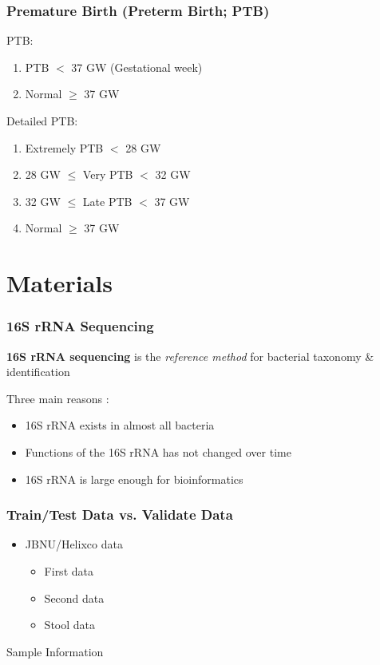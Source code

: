 \documentclass{beamer}
\begin{document}
    \begin{frame}
        \frametitle{Premature Birth (Preterm Birth; PTB)}

        PTB:
        \begin{enumerate}
            \item PTB $<$ 37 GW (Gestational week)
            \item Normal $\ge$ 37 GW
        \end{enumerate}

        Detailed PTB:
        \begin{enumerate}
            \item Extremely PTB $<$ 28 GW
            \item 28 GW $\le$ Very PTB $<$ 32 GW
            \item 32 GW $\le$ Late PTB $<$ 37 GW
            \item Normal $\ge$ 37 GW
        \end{enumerate}

        \cite{premature1, premature2}
    \end{frame}

    \section{Materials}
    \begin{frame}
        \frametitle{16S rRNA Sequencing}

        \textbf{16S rRNA sequencing} is the \textit{reference method} for bacterial taxonomy \& identification \cite{16S1}

        Three main reasons \cite{16S2}:
        \begin{itemize}
            \item 16S rRNA exists in almost all bacteria
            \item Functions of the 16S rRNA has not changed over time
            \item 16S rRNA is large enough for bioinformatics
        \end{itemize}
    \end{frame}

    \begin{frame}
        \frametitle{Train/Test Data vs. Validate Data}
        \begin{itemize}
            \item JBNU/Helixco data
            \begin{itemize}
                \item First data
                \item Second data
                \item Stool data
            \end{itemize}
        \end{itemize}

        \begin{table}
            \centering
            \caption{Sample Information}
            
        \end{table}
    \end{frame}
\end{document}
